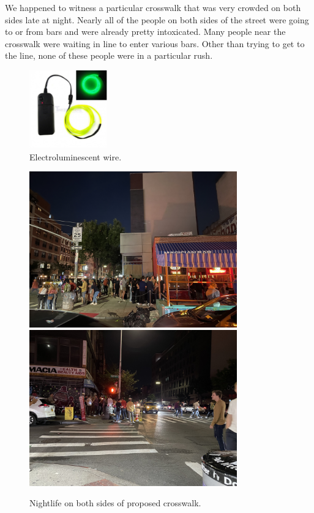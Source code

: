\documentclass[11pt]{report}
\begin{document}
We happened to witness a particular crosswalk that was very crowded on both sides late at night. Nearly all of the people on both sides of the street were going to or from bars and were already pretty intoxicated. Many people near the crosswalk were waiting in line to enter various bars. Other than trying to get to the line, none of these people were in a particular rush. 

\begin{figure}[ht!]
\centering
\includegraphics[width=0.3\textwidth]{"images/II/elwire.jpg"}
\caption{Electroluminescent wire.}
\end{figure}

\begin{figure}[ht!]
\centering
\includegraphics[width=0.8\textwidth]{"images/II/essex_magicianbar.JPG"}
\\
\includegraphics[width=0.8\textwidth]{"images/II/essex_opposite.JPG"}
\caption{Nightlife on both sides of proposed crosswalk.}
\end{figure}
\end{document}

